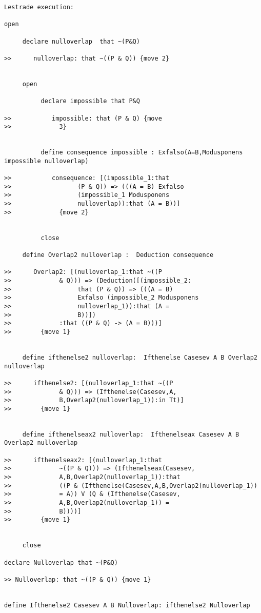 \documentclass[12pt]{article}
\begin{document}
\begin{verbatim}Lestrade execution:

open

     declare nulloverlap  that ~(P&Q)

>>      nulloverlap: that ~((P & Q)) {move 2}


     open

          declare impossible that P&Q

>>           impossible: that (P & Q) {move 
>>             3}


          define consequence impossible : Exfalso(A=B,Modusponens impossible nulloverlap)

>>           consequence: [(impossible_1:that 
>>                  (P & Q)) => (((A = B) Exfalso 
>>                  (impossible_1 Modusponens 
>>                  nulloverlap)):that (A = B))]
>>             {move 2}


          close

     define Overlap2 nulloverlap :  Deduction consequence

>>      Overlap2: [(nulloverlap_1:that ~((P 
>>             & Q))) => (Deduction([(impossible_2:
>>                  that (P & Q)) => (((A = B) 
>>                  Exfalso (impossible_2 Modusponens 
>>                  nulloverlap_1)):that (A = 
>>                  B))])
>>             :that ((P & Q) -> (A = B)))]
>>        {move 1}


     define ifthenelse2 nulloverlap:  Ifthenelse Casesev A B Overlap2 nulloverlap

>>      ifthenelse2: [(nulloverlap_1:that ~((P 
>>             & Q))) => (Ifthenelse(Casesev,A,
>>             B,Overlap2(nulloverlap_1)):in Tt)]
>>        {move 1}


     define ifthenelseax2 nulloverlap:  Ifthenelseax Casesev A B Overlap2 nulloverlap

>>      ifthenelseax2: [(nulloverlap_1:that 
>>             ~((P & Q))) => (Ifthenelseax(Casesev,
>>             A,B,Overlap2(nulloverlap_1)):that 
>>             ((P & (Ifthenelse(Casesev,A,B,Overlap2(nulloverlap_1)) 
>>             = A)) V (Q & (Ifthenelse(Casesev,
>>             A,B,Overlap2(nulloverlap_1)) = 
>>             B))))]
>>        {move 1}


     close

declare Nulloverlap that ~(P&Q)

>> Nulloverlap: that ~((P & Q)) {move 1}


define Ifthenelse2 Casesev A B Nulloverlap: ifthenelse2 Nulloverlap


\end{verbatim}
\end{document}
